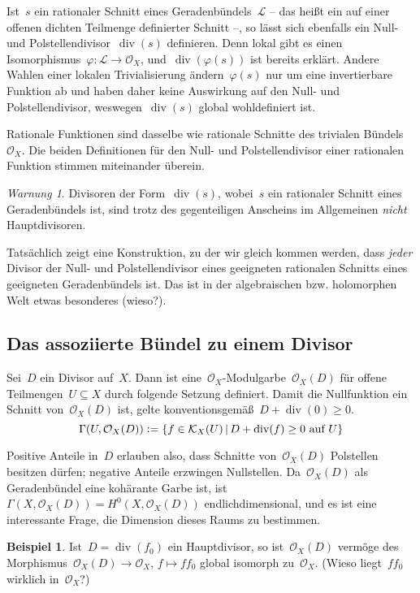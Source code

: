 \documentclass[a4paper,ngerman,12pt]{scrartcl}
\theoremstyle{definition}
\newtheorem{ex}[defn]{Beispiel}
\theoremstyle{plain}
\theoremstyle{remark}
\newtheorem{warning}[defn]{Warnung}
\newcommand{\K}{\mathcal{K}}
\renewcommand{\L}{\mathcal{L}}
\renewcommand{\O}{\mathcal{O}}
\renewcommand{\div}{\operatorname{div}}
\newcommand{\defeq}{\vcentcolon=}
\begin{document}
Ist~$s$ ein rationaler Schnitt eines Geradenbündels~$\L$ -- das heißt ein auf
einer offenen dichten Teilmenge definierter Schnitt --, so lässt sich ebenfalls
ein Null- und Polstellendivisor~$\div(s)$ definieren. Denn lokal gibt es einen
Isomorphismus~$\varphi : \L \to \O_X$, und~$\div(\varphi(s))$ ist bereits
erklärt. Andere Wahlen einer lokalen Trivialisierung ändern~$\varphi(s)$ nur um
eine invertierbare Funktion ab und haben daher keine Auswirkung auf den Null-
und Polstellendivisor, weswegen~$\div(s)$ global wohldefiniert ist.

Rationale Funktionen sind dasselbe wie rationale Schnitte des trivialen
Bündels~$\O_X$. Die beiden Definitionen für den Null- und
Polstellendivisor einer rationalen Funktion stimmen miteinander überein.

\begin{warning}Divisoren der Form~$\div(s)$, wobei~$s$ ein rationaler Schnitt
eines Geradenbündels ist, sind trotz des gegenteiligen Anscheins im
Allgemeinen \emph{nicht} Hauptdivisoren.\end{warning}

Tatsächlich zeigt eine Konstruktion, zu der wir gleich kommen werden, dass
\emph{jeder} Divisor der Null- und Polstellendivisor eines geeigneten rationalen Schnitts
eines geeigneten Geradenbündels ist. Das ist in der algebraischen bzw.
holomorphen Welt etwas besonderes (wieso?).


\subsection*{Das assoziierte Bündel zu einem Divisor}

\begin{defn}Sei~$D$ ein Divisor auf~$X$. Dann ist
eine~$\O_X$-Modulgarbe~$\O_X(D)$ für offene Teilmengen~$U \subseteq X$ durch
folgende Setzung definiert. Damit die Nullfunktion ein Schnitt von~$\O_X(D)$
ist, gelte konventionsgemäß~$D + \div(0) \geq 0$.
\[ \Gamma(U, \O_X(D)) \defeq \{ f \in \K_X(U) \,|\, \text{$D + \div(f) \geq 0$
auf~$U$} \} \]
\end{defn}

Positive Anteile in~$D$ erlauben also, dass Schnitte von~$\O_X(D)$ Polstellen
besitzen dürfen; negative Anteile erzwingen Nullstellen. Da~$\O_X(D)$ als
Geradenbündel eine kohärante Garbe ist, ist~$\Gamma(X,\O_X(D)) =
H^0(X,\O_X(D))$ endlichdimensional, und es ist eine interessante Frage, die
Dimension dieses Raums zu bestimmen.

\begin{ex}\label{ex:o-hauptdivisor}
Ist~$D = \div(f_0)$ ein Hauptdivisor, so ist~$\O_X(D)$ vermöge des
Morphismus~$\O_X(D) \to \O_X$, $f \mapsto f f_0$ global isomorph zu~$\O_X$.
(Wieso liegt~$f f_0$ wirklich in~$\O_X$?)\end{ex}
\end{document}
